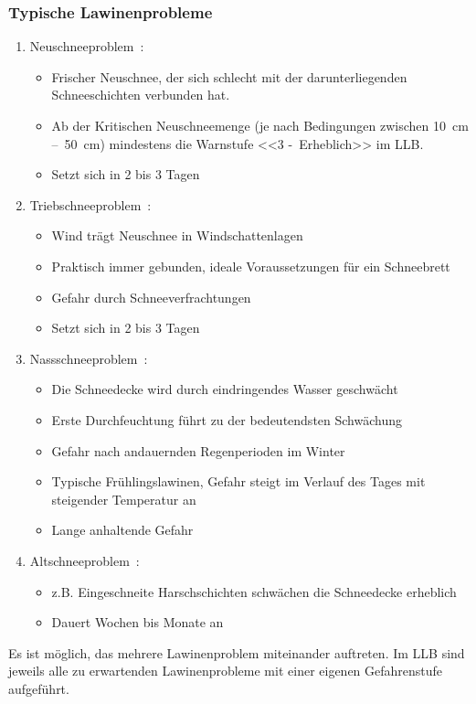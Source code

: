 \begin{multicols}{2}
\subsubsection{Typische Lawinenprobleme}\label{lawinenprobleme}

\begin{enumerate}
  \item Neuschneeproblem~\cite{achtunglawine}:
  \begin{itemize}
    \item Frischer Neuschnee, der sich schlecht mit der darunterliegenden Schneeschichten verbunden hat. 
    \item Ab der Kritischen Neuschneemenge (je nach Bedingungen zwischen \qty{10}{cm} --~\qty{50}{cm}) mindestens die Warnstufe <<3 -~Erheblich>> im LLB.\@
    \item Setzt sich in 2 bis 3 Tagen
  \end{itemize}
  \item Triebschneeproblem~\cite{achtunglawine}:
  \begin{itemize}
    \item Wind trägt Neuschnee in Windschattenlagen
    \item Praktisch immer gebunden, ideale Voraussetzungen für ein Schneebrett
    \item Gefahr durch Schneeverfrachtungen
    \item Setzt sich in 2 bis 3 Tagen
  \end{itemize}
  \item Nassschneeproblem~\cite{achtunglawine}:
  \begin{itemize}
    \item Die Schneedecke wird durch eindringendes Wasser geschwächt
    \item Erste Durchfeuchtung führt zu der bedeutendsten Schwächung
    \item Gefahr nach andauernden Regenperioden im Winter
    \item Typische Frühlingslawinen, Gefahr steigt im Verlauf des Tages mit steigender Temperatur an
    \item Lange anhaltende Gefahr
  \end{itemize}
  \item Altschneeproblem~\cite{achtunglawine}:
  \begin{itemize}
    \item z.B. Eingeschneite Harschschichten schwächen die Schneedecke erheblich
    \item Dauert Wochen bis Monate an
  \end{itemize}
\end{enumerate}
Es ist möglich, das mehrere Lawinenproblem miteinander auftreten. Im LLB sind jeweils alle zu erwartenden Lawinenprobleme mit einer eigenen Gefahrenstufe aufgeführt.~\cite{slfTypischeLawinenprobleme}


\end{multicols}
